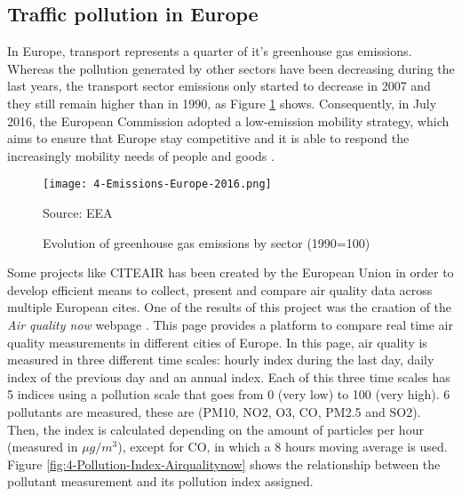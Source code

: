 \subsection{Traffic pollution in Europe}
In Europe, transport represents a quarter of it's greenhouse gas emissions. Whereas the pollution generated by other sectors have been decreasing during the last years, the transport sector emissions only started to decrease in 2007 and they still remain higher than in 1990, as Figure \ref{fig:4-Emissions-Europe-2016} shows. Consequently, in July 2016, the European Commission adopted a low-emission mobility strategy, which aims to ensure that Europe stay competitive and it is able to respond the increasingly mobility needs of people and goods \cite{EuStrat}. 

%
%
%




\cite{AirQualityEEA16}

\begin{figure}[!h]
	\begin{center}
		\texttt{[image: 4-Emissions-Europe-2016.png]}	
		\caption{Evolution of greenhouse gas emissions by sector (1990=100)}{Source: \ac{EEA}}
		\label{fig:4-Emissions-Europe-2016}
	\end{center}
\end{figure}


Some projects like \ac{CITEAIR} has been created by the European Union \cite{citeair} in order to develop efficient means to collect, present and compare air quality data across multiple European cites. One of the results of this project was the craation of the \emph{Air quality now} webpage \cite{airqualitynow}. This page provides a platform to compare real time air quality measurements in different cities of Europe. In this page, air quality is measured in three different time scales: hourly index during the last day, daily index of the previous day and an annual index. Each of this three time scales has 5 indices using a pollution scale that goes from 0 (very low) to 100 (very high). 6 pollutants are measured, these are (PM10, NO2, O3, CO, PM2.5 and SO2). Then, the index is calculated depending on the amount of particles per hour (measured in $\mu g/m^3$), except for CO, in which a 8 hours moving average is used. Figure \ref{fig:4-Pollution-Index-Airqualitynow} shows the relationship between the pollutant measurement and its pollution index assigned.

